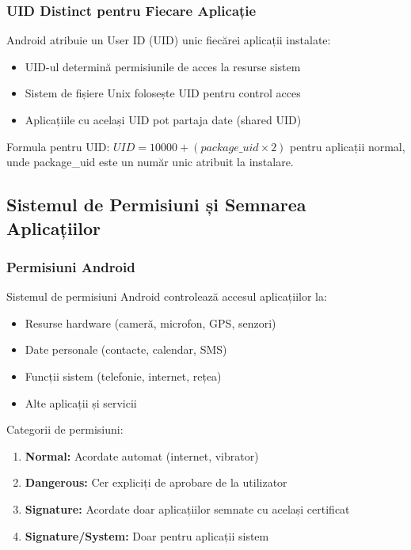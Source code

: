 \documentclass[11pt,a4paper,twocolumn]{article}
\theoremstyle{definition}
\theoremstyle{plain}
\theoremstyle{remark}
\begin{document}
\subsubsection{UID Distinct pentru Fiecare Aplicație}
Android atribuie un User ID (UID) unic fiecărei aplicații instalate:
\begin{itemize}
    \item UID-ul determină permisiunile de acces la resurse sistem
    \item Sistem de fișiere Unix folosește UID pentru control acces
    \item Aplicațiile cu același UID pot partaja date (shared UID)
\end{itemize}

Formula pentru UID: $UID = 10000 + (package\_uid \times 2)$ pentru aplicații normal, 
unde package\_uid este un număr unic atribuit la instalare.

\subsection{Sistemul de Permisiuni și Semnarea Aplicațiilor}

\subsubsection{Permisiuni Android}
Sistemul de permisiuni Android controlează accesul aplicațiilor la:
\begin{itemize}
    \item Resurse hardware (cameră, microfon, GPS, senzori)
    \item Date personale (contacte, calendar, SMS)
    \item Funcții sistem (telefonie, internet, rețea)
    \item Alte aplicații și servicii
\end{itemize}

Categorii de permisiuni:
\begin{enumerate}
    \item \textbf{Normal:} Acordate automat (internet, vibrator)
    \item \textbf{Dangerous:} Cer expliciți de aprobare de la utilizator
    \item \textbf{Signature:} Acordate doar aplicațiilor semnate cu același certificat
    \item \textbf{Signature/System:} Doar pentru aplicații sistem
\end{enumerate}
\end{document}
